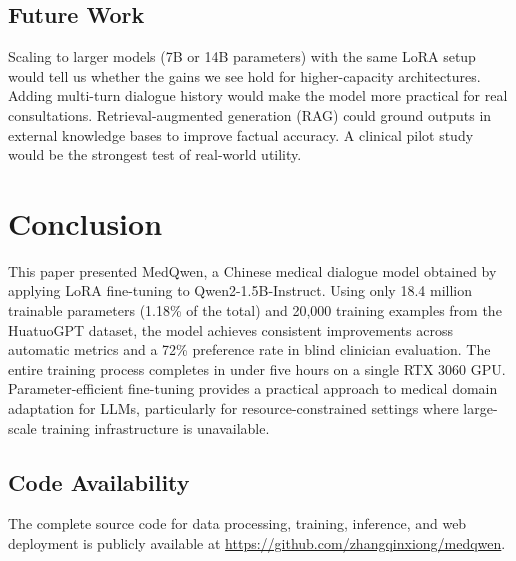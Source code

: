 \documentclass[12pt,a4paper]{article}
\begin{document}
\subsection{Future Work}

Scaling to larger models (7B or 14B parameters) with the same LoRA setup would tell us whether the gains we see hold for higher-capacity architectures. Adding multi-turn dialogue history would make the model more practical for real consultations. Retrieval-augmented generation (RAG) could ground outputs in external knowledge bases to improve factual accuracy. A clinical pilot study would be the strongest test of real-world utility.

\section{Conclusion}
\label{sec:conclusion}

This paper presented MedQwen, a Chinese medical dialogue model obtained by applying LoRA fine-tuning to Qwen2-1.5B-Instruct. Using only 18.4 million trainable parameters (1.18\% of the total) and 20,000 training examples from the HuatuoGPT dataset, the model achieves consistent improvements across automatic metrics and a 72\% preference rate in blind clinician evaluation. The entire training process completes in under five hours on a single RTX 3060 GPU. Parameter-efficient fine-tuning provides a practical approach to medical domain adaptation for LLMs, particularly for resource-constrained settings where large-scale training infrastructure is unavailable.

\subsection*{Code Availability}
The complete source code for data processing, training, inference, and web deployment is publicly available at \url{https://github.com/zhangqinxiong/medqwen}.



\end{document}

